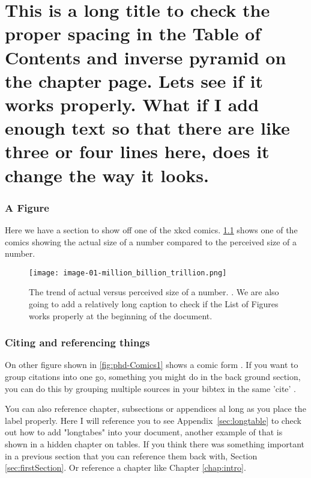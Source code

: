\chapter[This is a long title to check the proper spacing in the
Table of Contents and inverse pyramid on the chapter page. Lets see if it works properly. What if I add enough text so that there are like three or four lines here, does it change the way it looks.]{This is a long title to check the proper spacing in the
Table of Contents and\newline
inverse pyramid on the chapter page. Lets see if it works properly. What if\newline
I add enough text so that there are like three or four lines here,\newline
does it change the way it looks.}



\subsection{A Figure}
Here we have a section to show off one of the xkcd comics. \ref{fig:xkcd1} shows one of the comics showing the actual size of a number compared to the perceived size of a number. 

\begin{figure}[ht]
    \centering
    \texttt{[image: image-01-million\_billion\_trillion.png]}
    \caption{The trend of actual versus perceived size of a number. \cite{cite-munroe_2018}. We are also
    going to add a relatively long caption to check if the List of Figures works properly at the beginning of the document.}
    \label{fig:xkcd1}
\end{figure}

\subsection{Citing and referencing things}
On other figure shown in \ref{fig:phd-Comics1} shows a comic form \cite{cite-cham_2009}. 
If you want to group citations into one go, something you might do in the back ground section, you can do this by grouping multiple sources in your bibtex in the same 'cite' \cite{cite-A,cite-B,cite-C, cite-munroe_2018}.

You can also reference chapter, subsections or appendices al long as you place the label properly. Here I will reference you to see Appendix~\ref{sec:longtable} to check out how to add "longtabes" into your document, another example of that is shown in a hidden chapter on tables.
If you think there was something important in a previous section that you can reference them back with, Section \ref{sec:firstSection}. Or reference a chapter like Chapter \ref{chap:intro}.

